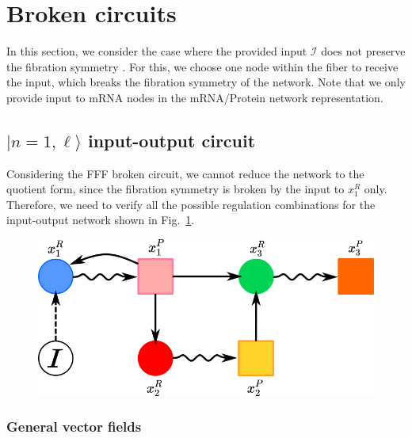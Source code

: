 \section{Broken circuits}
\label{sec:broken}

In this section, we consider the case where the provided input 
$\mathcal{I}$ does not preserve the fibration symmetry 
\cite{Boldi2002,morone2020}. For this, we choose one node within 
the fiber to receive the input, which breaks
the fibration symmetry of the network. Note that we only provide 
input to mRNA nodes in the mRNA/Protein network representation.

\subsection{$|n = 1, \ell \rangle$ input-output circuit}
\label{ssec:broken_n1}

Considering the FFF broken circuit, we cannot reduce the network to the 
quotient form, since the fibration symmetry is broken by the 
input to $x_1^R$ only. Therefore, we need to verify all the possible 
regulation combinations for the input-output network shown 
in Fig.~\ref{fig:broken_n1}.

\begin{figure}[H]
    \centering
    \includegraphics[scale=0.65]{figs/broken_n1.png}
    \caption{}
    \label{fig:broken_n1}
\end{figure}

\subsubsection{General vector fields}

